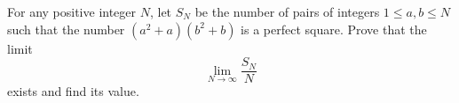 For any positive integer \(N\), let \(S_N\) be the number of pairs of integers \(1 \le a, b \le N\) such that the number \((a^2 + a)(b^2 + b)\) is a perfect square. Prove that the limit
\[
\lim_{N \to \infty} \frac{S_N}{N}
\]
exists and find its value.
